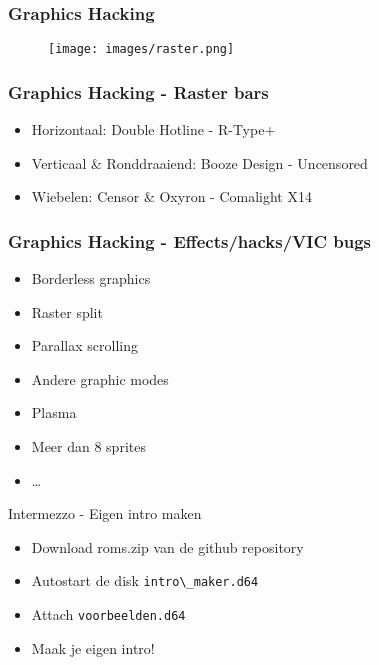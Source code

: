 
\begin{frame}
\frametitle{Graphics Hacking}

\begin{figure}
\texttt{[image: images/raster.png]}
\end{figure}

\end{frame}


\begin{frame}
\frametitle{Graphics Hacking - Raster bars}

\begin{itemize}
\item Horizontaal: Double Hotline - R-Type+
\item Verticaal \& Ronddraaiend: Booze Design - Uncensored
\item Wiebelen: Censor \& Oxyron - Comalight X14
\end{itemize}

\end{frame}


\begin{frame}
\frametitle{Graphics Hacking - Effects/hacks/VIC bugs}

\begin{itemize}
\item Borderless graphics
\item Raster split
\item Parallax scrolling
\item Andere graphic modes
\item Plasma
\item Meer dan 8 sprites
\item \dots
\end{itemize}

\end{frame}


\begin{frame}{Intermezzo - Eigen intro maken}

\begin{itemize}
\item Download roms.zip van de github repository
\item Autostart de disk \verb:intro\_maker.d64:
\item Attach \verb:voorbeelden.d64:
\item Maak je eigen intro!
\end{itemize}

\end{frame}
